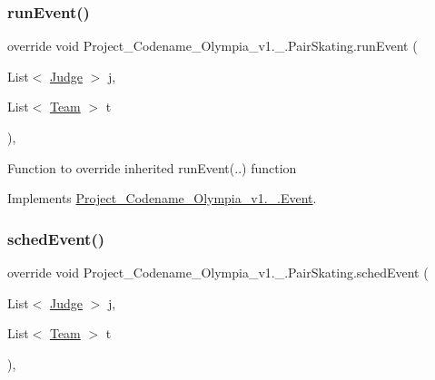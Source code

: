 \mbox{\label{classProject__Codename__Olympia__v1_1_1__0_1_1PairSkating_a5150348cf16352d2ce4ae63ac4e8a44d}} 
\subsubsection{\texorpdfstring{run\+Event()}{runEvent()}}
{\footnotesize\ttfamily override void Project\+\_\+\+Codename\+\_\+\+Olympia\+\_\+v1.\+\_.\+Pair\+Skating.\+run\+Event (\begin{DoxyParamCaption}\item[{List$<$ \hyperlink{classProject__Codename__Olympia__v1_1_1__0_1_1Judge}{Judge} $>$}]{j,  }\item[{List$<$ \hyperlink{classProject__Codename__Olympia__v1_1_1__0_1_1Team}{Team} $>$}]{t }\end{DoxyParamCaption})\hspace{0.3cm}{\ttfamily [inline]}, {\ttfamily [virtual]}}

Function to override inherited run\+Event(..) function 

Implements \hyperlink{classProject__Codename__Olympia__v1_1_1__0_1_1Event_ac6ff060da23153c02da49937dcf9f326}{Project\+\_\+\+Codename\+\_\+\+Olympia\+\_\+v1.\+\_.\+Event}.

\mbox{\label{classProject__Codename__Olympia__v1_1_1__0_1_1PairSkating_abc9c2d9765ad831e59228697a334da6d}} 
\subsubsection{\texorpdfstring{sched\+Event()}{schedEvent()}}
{\footnotesize\ttfamily override void Project\+\_\+\+Codename\+\_\+\+Olympia\+\_\+v1.\+\_.\+Pair\+Skating.\+sched\+Event (\begin{DoxyParamCaption}\item[{List$<$ \hyperlink{classProject__Codename__Olympia__v1_1_1__0_1_1Judge}{Judge} $>$}]{j,  }\item[{List$<$ \hyperlink{classProject__Codename__Olympia__v1_1_1__0_1_1Team}{Team} $>$}]{t }\end{DoxyParamCaption})\hspace{0.3cm}{\ttfamily [inline]}, {\ttfamily [virtual]}}


